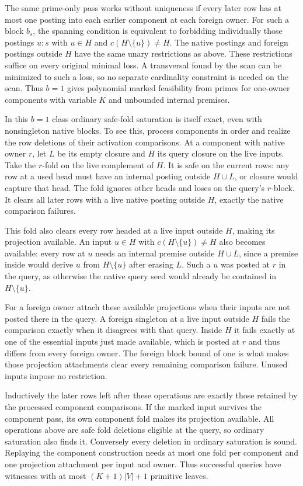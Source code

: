 The same prime-only pass works without uniqueness
if every later row has at most one posting into
each earlier component at each foreign owner.
For such a block $b_s$, the spanning condition is
equivalent to forbidding individually those
postings $u:s$ with $u\in H$ and
$c(H\setminus\{u\})\ne H$. The native postings and
foreign postings outside $H$ have the same unary
restrictions as above. These restrictions suffice
on every original minimal loss. A transversal
found by the scan can be minimized to such a loss,
so no separate cardinality constraint is needed
on the scan. Thus $b=1$ gives polynomial marked
feasibility from primes for one-owner components
with variable $K$ and unbounded internal premises.

In this $b=1$ class ordinary safe-fold saturation
is itself exact, even with nonsingleton native
blocks. To see this, process components in order
and realize the row deletions of their activation
comparisons. At a component with native owner $r$,
let $L$ be its empty closure and $H$ its query
closure on the live inputs. Take the $r$-fold on
the live complement of $H$. It is safe on the
current rows: any row at a used head must have
an internal posting outside $H\cup L$, or closure
would capture that head. The fold ignores other
heads and loses on the query's $r$-block. It
clears all later rows with a live native posting
outside $H$, exactly the native comparison
failures.

This fold also clears every row headed at a live
input outside $H$, making its projection
available. An input $u\in H$ with
$c(H\setminus\{u\})\ne H$ also becomes available:
every row at $u$ needs an internal premise
outside $H\cup L$, since a premise inside would
derive $u$ from $H\setminus\{u\}$ after erasing
$L$. Such a $u$ was posted at $r$ in the query,
as otherwise the native query seed would already
be contained in $H\setminus\{u\}$.

For a foreign owner attach these available
projections when their inputs are not posted
there in the query. A foreign singleton at a
live input outside $H$ fails the comparison
exactly when it disagrees with that query.
Inside $H$ it fails exactly at one of the
essential inputs just made available, which
is posted at $r$ and thus differs from every
foreign owner. The foreign block bound of
one is what makes those projection attachments
clear every remaining comparison failure.
Unused inputs impose no restriction.

Inductively the later rows left after these
operations are exactly those retained by the
processed component comparisons. If the marked
input survives the component pass, its own
component fold makes its projection available.
All operations above are safe fold deletions
eligible at the query, so ordinary saturation
also finds it. Conversely every deletion in
ordinary saturation is sound. Replaying the
component construction needs at most one fold
per component and one projection attachment
per input and owner. Thus successful queries
have witnesses with at most $(K+1)|V|+1$
primitive leaves.

